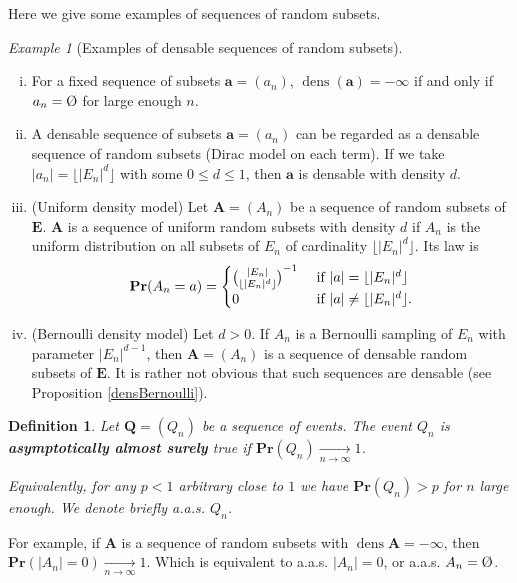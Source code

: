 \documentclass{article}
\DeclareMathOperator{\dens}{dens}
\newcommand{\vide}{\textup{\O}}
\newcommand{\moinsun}{^{-1}}
\newcommand{\bs}{\boldsymbol}
\newcommand{\tendvers}{\xrightarrow[n\to\infty]{}}
\def\Pr{\mathbf{Pr}}
\newtheorem{defi}[thm]{Definition}
\theoremstyle{remark}
\newtheorem{ex}[thm]{Example}
\begin{document}
Here we give some examples of sequences of random subsets.
\begin{ex}[Examples of densable sequences of random subsets]\label{ex densable sequences}\quad
\begin{enumerate}[(i)]
    \item For a fixed sequence of subsets $\bs a = (a_n)$, $\dens(\bs a) = -\infty$ if and only if $a_n = \vide$ for large enough $n$.

    \item A densable sequence of subsets $\bs{a} = (a_n)$ can be regarded as a densable sequence of random subsets (Dirac model on each term). If we take $|a_n| = \lfloor|E_n|^d\rfloor$ with some $0\leq d\leq 1$, then $\bs a$ is densable with density $d$.
    
    \item (Uniform density model) Let $\bs A = (A_n)$ be a sequence of random subsets of $\bs E$. $\bs A$ is a sequence of uniform random subsets with density $d$ if $A_n$ is the uniform distribution on all subsets of $E_n$ of cardinality $\lfloor|E_n|^d\rfloor$. Its law is
        \[\Pr(A_n=a)=\begin{cases}
        \binom{|E_n|}{\lfloor|E_n|^d\rfloor}\moinsun & \textup{ if } |a| = \lfloor|E_n|^d\rfloor \\
        0 & \textup{ if } |a| \neq \lfloor|E_n|^d\rfloor.
        \end{cases}\]
    \item (Bernoulli density model) Let $d>0$. If $A_n$ is a Bernoulli sampling of $E_n$ with parameter $|E_n|^{d-1}$, then $\bs A = (A_n)$ is a sequence of densable random subsets of $\bs E$. It is rather not obvious that such sequences are densable (see Proposition \ref{densBernoulli}).
\end{enumerate}
\end{ex}\quad

\begin{defi}\label{definition a.a.s.}
Let $\bs{Q} = (Q_n)$ be a sequence of events. The event $Q_n$ is \textbf{asymptotically almost surely} true if $\Pr(Q_n)\xrightarrow[n\to\infty]{}1$. 

Equivalently, for any $p<1$ arbitrary close to $1$ we have $\Pr(Q_n)>p$ for $n$ large enough. We denote briefly a.a.s. $Q_n$.
\end{defi}

For example, if $\bs A$ is a sequence of random subsets with $\dens \bs A = -\infty$, then $\Pr(|A_n| = 0)\tendvers 1$. Which is equivalent to a.a.s. $|A_n| = 0$, or a.a.s. $A_n = \vide$.\\
\end{document}
